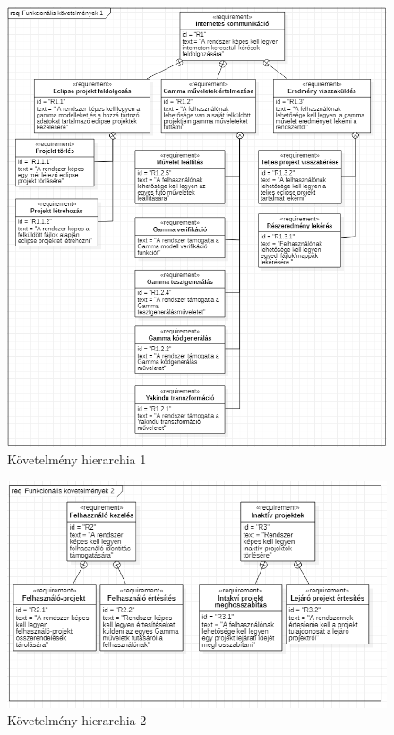 \begin{figure}[!ht]
	\includegraphics[width=\textwidth, keepaspectratio]{figures/requierments_placeholder.png}
	\caption{Követelmény hierarchia 1}
	\label{fig:requierments_placeholder}
\end{figure}

\begin{figure}[!ht]
	\includegraphics[width=150mm, keepaspectratio]{figures/requierments_2.png}
	\caption{Követelmény hierarchia 2}
	\label{fig:requierements_2}
\end{figure}

